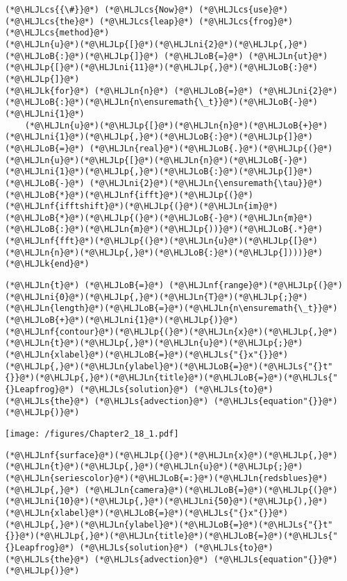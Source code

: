 \documentclass[12pt,landscape]{article}
\newcommand{\HLJLk}[1]{\textcolor[RGB]{148,91,176}{\textbf{#1}}}
\newcommand{\HLJLn}[1]{#1}
\newcommand{\HLJLnf}[1]{\textcolor[RGB]{66,102,213}{#1}}
\newcommand{\HLJLs}[1]{\textcolor[RGB]{201,61,57}{#1}}
\newcommand{\HLJLni}[1]{\textcolor[RGB]{59,151,46}{#1}}
\newcommand{\HLJLoB}[1]{\textcolor[RGB]{102,102,102}{\textbf{#1}}}
\newcommand{\HLJLp}[1]{#1}
\newcommand{\HLJLcs}[1]{\textcolor[RGB]{153,153,119}{\textit{#1}}}
\begin{document}
{\begin{lstlisting}
(*@\HLJLcs{{\#}}@*) (*@\HLJLcs{Now}@*) (*@\HLJLcs{use}@*) (*@\HLJLcs{the}@*) (*@\HLJLcs{leap}@*) (*@\HLJLcs{frog}@*) (*@\HLJLcs{method}@*)
(*@\HLJLn{u}@*)(*@\HLJLp{[}@*)(*@\HLJLni{2}@*)(*@\HLJLp{,}@*)(*@\HLJLoB{:}@*)(*@\HLJLp{]}@*) (*@\HLJLoB{=}@*) (*@\HLJLn{ut}@*)(*@\HLJLp{[}@*)(*@\HLJLni{11}@*)(*@\HLJLp{,}@*)(*@\HLJLoB{:}@*)(*@\HLJLp{]}@*)
(*@\HLJLk{for}@*) (*@\HLJLn{n}@*) (*@\HLJLoB{=}@*) (*@\HLJLni{2}@*)(*@\HLJLoB{:}@*)(*@\HLJLn{n\ensuremath{\_t}}@*)(*@\HLJLoB{-}@*)(*@\HLJLni{1}@*)
    (*@\HLJLn{u}@*)(*@\HLJLp{[}@*)(*@\HLJLn{n}@*)(*@\HLJLoB{+}@*)(*@\HLJLni{1}@*)(*@\HLJLp{,}@*)(*@\HLJLoB{:}@*)(*@\HLJLp{]}@*) (*@\HLJLoB{=}@*) (*@\HLJLn{real}@*)(*@\HLJLoB{.}@*)(*@\HLJLp{(}@*)(*@\HLJLn{u}@*)(*@\HLJLp{[}@*)(*@\HLJLn{n}@*)(*@\HLJLoB{-}@*)(*@\HLJLni{1}@*)(*@\HLJLp{,}@*)(*@\HLJLoB{:}@*)(*@\HLJLp{]}@*) (*@\HLJLoB{-}@*) (*@\HLJLni{2}@*)(*@\HLJLn{\ensuremath{\tau}}@*)(*@\HLJLoB{*}@*)(*@\HLJLnf{ifft}@*)(*@\HLJLp{(}@*)(*@\HLJLnf{ifftshift}@*)(*@\HLJLp{(}@*)(*@\HLJLn{im}@*)(*@\HLJLoB{*}@*)(*@\HLJLp{(}@*)(*@\HLJLoB{-}@*)(*@\HLJLn{m}@*)(*@\HLJLoB{:}@*)(*@\HLJLn{m}@*)(*@\HLJLp{))}@*)(*@\HLJLoB{.*}@*)(*@\HLJLnf{fft}@*)(*@\HLJLp{(}@*)(*@\HLJLn{u}@*)(*@\HLJLp{[}@*)(*@\HLJLn{n}@*)(*@\HLJLp{,}@*)(*@\HLJLoB{:}@*)(*@\HLJLp{])))}@*)
(*@\HLJLk{end}@*)
\end{lstlisting}


\begin{lstlisting}
(*@\HLJLn{t}@*) (*@\HLJLoB{=}@*) (*@\HLJLnf{range}@*)(*@\HLJLp{(}@*)(*@\HLJLni{0}@*)(*@\HLJLp{,}@*)(*@\HLJLn{T}@*)(*@\HLJLp{;}@*)(*@\HLJLn{length}@*)(*@\HLJLoB{=}@*)(*@\HLJLn{n\ensuremath{\_t}}@*)(*@\HLJLoB{+}@*)(*@\HLJLni{1}@*)(*@\HLJLp{)}@*)
(*@\HLJLnf{contour}@*)(*@\HLJLp{(}@*)(*@\HLJLn{x}@*)(*@\HLJLp{,}@*)(*@\HLJLn{t}@*)(*@\HLJLp{,}@*)(*@\HLJLn{u}@*)(*@\HLJLp{;}@*)(*@\HLJLn{xlabel}@*)(*@\HLJLoB{=}@*)(*@\HLJLs{"{}x"{}}@*)(*@\HLJLp{,}@*)(*@\HLJLn{ylabel}@*)(*@\HLJLoB{=}@*)(*@\HLJLs{"{}t"{}}@*)(*@\HLJLp{,}@*)(*@\HLJLn{title}@*)(*@\HLJLoB{=}@*)(*@\HLJLs{"{}Leapfrog}@*) (*@\HLJLs{solution}@*) (*@\HLJLs{to}@*) (*@\HLJLs{the}@*) (*@\HLJLs{advection}@*) (*@\HLJLs{equation"{}}@*)(*@\HLJLp{)}@*)
\end{lstlisting}

\texttt{[image: /figures/Chapter2\_18\_1.pdf]}

\begin{lstlisting}
(*@\HLJLnf{surface}@*)(*@\HLJLp{(}@*)(*@\HLJLn{x}@*)(*@\HLJLp{,}@*)(*@\HLJLn{t}@*)(*@\HLJLp{,}@*)(*@\HLJLn{u}@*)(*@\HLJLp{;}@*)(*@\HLJLn{seriescolor}@*)(*@\HLJLoB{=:}@*)(*@\HLJLn{redsblues}@*)(*@\HLJLp{,}@*) (*@\HLJLn{camera}@*)(*@\HLJLoB{=}@*)(*@\HLJLp{(}@*)(*@\HLJLni{10}@*)(*@\HLJLp{,}@*)(*@\HLJLni{50}@*)(*@\HLJLp{),}@*)
(*@\HLJLn{xlabel}@*)(*@\HLJLoB{=}@*)(*@\HLJLs{"{}x"{}}@*)(*@\HLJLp{,}@*)(*@\HLJLn{ylabel}@*)(*@\HLJLoB{=}@*)(*@\HLJLs{"{}t"{}}@*)(*@\HLJLp{,}@*)(*@\HLJLn{title}@*)(*@\HLJLoB{=}@*)(*@\HLJLs{"{}Leapfrog}@*) (*@\HLJLs{solution}@*) (*@\HLJLs{to}@*) (*@\HLJLs{the}@*) (*@\HLJLs{advection}@*) (*@\HLJLs{equation"{}}@*)(*@\HLJLp{)}@*)
\end{lstlisting}

}
\end{document}
